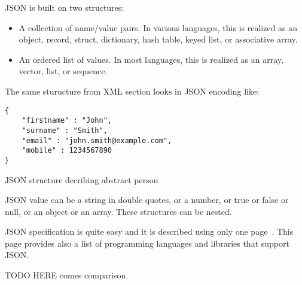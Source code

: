 JSON is built on two structures\cite{json_org}:
\begin{itemize}
  \item A collection of name/value pairs. In various languages, this is realized
  as an object, record, struct, dictionary, hash table, keyed list, or associative array.
  \item An ordered list of values. In most languages, this is realized as an
  array, vector, list, or sequence.
\end{itemize}

The same sturucture from XML section looks in JSON encoding like:
\begin{listing}[H]
\begin{verbatim}
{
	"firstname" : "John",
	"surname" : "Smith",
	"email" : "john.smith@example.com",
	"mobile" : 1234567890
}
\end{verbatim}
\caption{JSON structure decribing abstract person}
\label{lst:json_person_example}
\end{listing}

JSON value can be a string in double quotes, or a number, or true or false or
null, or an object or an array. These structures can be nested.

JSON specification is quite easy and it is  described using only one
page~\cite{json_org}. This page provides also a list of programming languages
and libraries that support JSON. 

TODO HERE comes comparison.    


